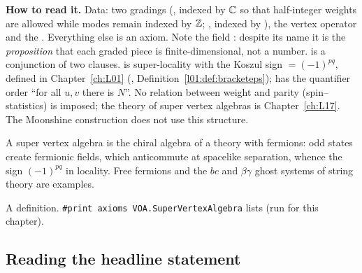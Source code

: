 \begin{dictionary}
\textbf{How to read it.} Data: two gradings (, indexed by ${\mathbb{C}}$ so that half-integer
weights are allowed while modes remain indexed by ${\mathbb{Z}}$; , indexed by ), the
vertex operator  and the . Everything else is an axiom. Note the field
: despite its name it is the \emph{proposition} that each graded piece is
finite-dimensional, not a number.  is a conjunction  of two clauses.
 is super-locality with the Koszul sign  $=(-1)^{pq}$, defined in
Chapter~\ref{ch:L01} (, Definition~\ref{l01:def:bracketeps});  has the
quantifier order ``for all $u,v$ there is $N$''. No relation between weight and parity
(spin--statistics) is imposed; the theory of super vertex algebras is Chapter~\ref{ch:L17}. The
Moonshine construction does not use this structure.
\end{dictionary}

\begin{physics}
A super vertex algebra is the chiral algebra of a theory with fermions: odd states create fermionic
fields, which anticommute at spacelike separation, whence the sign $(-1)^{pq}$ in locality. Free
fermions and the $bc$ and $\beta\gamma$ ghost systems of string theory are examples.
\end{physics}

\begin{status}
A definition. \texttt{\#print axioms VOA.SuperVertexAlgebra} lists
 (run for this chapter).
\end{status}

\subsection{Reading the headline statement}\label{ch01:sec:headline}

